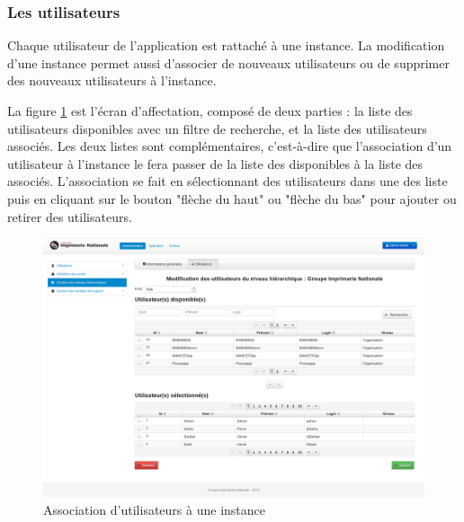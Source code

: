 \subsubsection{Les utilisateurs}

Chaque utilisateur de l'application est rattaché à une instance.
La modification d'une instance permet aussi d'associer de nouveaux utilisateurs ou de supprimer des nouveaux utilisateurs à l'instance.

La figure \ref{instances_utilisateurs} est l'écran d'affectation, composé de deux parties : la liste des utilisateurs disponibles avec un filtre de recherche, et la liste des utilisateurs associés.
Les deux listes sont complémentaires, c'est-à-dire que l'association d'un utilisateur à l'instance le fera passer de la liste des disponibles à la liste des associés.
L'association se fait en sélectionnant des utilisateurs dans une des liste puis en cliquant sur le bouton "flèche du haut" ou "flèche du bas" pour ajouter ou retirer des utilisateurs.
\begin{figure}[!h]
	\center
	\includegraphics[width=1\textwidth]{img/instances_utilisateurs.png}
	\caption{Association d'utilisateurs à une instance}
	\label{instances_utilisateurs}
\end{figure}


